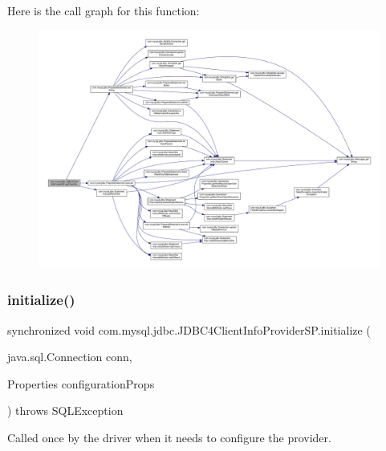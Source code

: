 Here is the call graph for this function\+:
\nopagebreak
\begin{figure}[H]
\begin{center}
\leavevmode
\includegraphics[width=350pt]{classcom_1_1mysql_1_1jdbc_1_1_j_d_b_c4_client_info_provider_s_p_a0b8221fb4e29722d7570124d595944fd_cgraph}
\end{center}
\end{figure}
\mbox{\label{classcom_1_1mysql_1_1jdbc_1_1_j_d_b_c4_client_info_provider_s_p_a5b14375f29d2bbe6298559600801cebc}} 
\subsubsection{\texorpdfstring{initialize()}{initialize()}}
{\footnotesize\ttfamily synchronized void com.\+mysql.\+jdbc.\+J\+D\+B\+C4\+Client\+Info\+Provider\+S\+P.\+initialize (\begin{DoxyParamCaption}\item[{java.\+sql.\+Connection}]{conn,  }\item[{Properties}]{configuration\+Props }\end{DoxyParamCaption}) throws S\+Q\+L\+Exception}

Called once by the driver when it needs to configure the provider.


